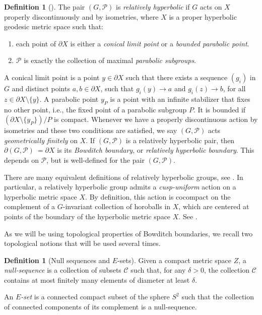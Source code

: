 \documentclass[11pt]{article}
\theoremstyle{definition}
\newtheorem{definition}[theorem]{Definition}
\newcommand\PP{\mathcal{P}}
\begin{document}
\begin{definition}[\cite{bowrelhyp}] \label{def:original rel hyp}  The pair $(G,\mathcal{P})$ is \textit{relatively hyperbolic} if $G$ acts on $X$ properly discontinuously and by isometries, where $X$ is a proper hyperbolic geodesic metric space such that:

\begin{enumerate}
	\item each point of $\partial X$ is either a \emph{conical limit point} or a \emph{bounded parabolic point}. 
	\item $\mathcal{P}$ is exactly the collection of maximal \emph{parabolic subgroups}.
\end{enumerate}

A conical limit point is a point $y \in \partial X$ such that
there exists a sequence $(g_i)$ in $G$  and distinct points $a, b \in \partial X$, such that $g_i(y) \rightarrow a$ and $g_i(z) \rightarrow b$, for all $z \in \partial X \setminus \{y\}$. A parabolic point $y_P$ is a point with an infinite stabilizer that fixes no other point, i.e., the fixed point of a parabolic subgroup $P$. It is  bounded if $(\partial X \setminus \{y_P\})/P$ is compact. 
Whenever we have a properly discontinuous action by isometries and these two conditions are satisfied, we say $(G, \mathcal{P})$ acts \textit{geometrically finitely} on $X$.  If $(G, \mathcal{P})$ is a relatively hyperbolic pair, then $\partial( G, \PP)\ = \partial X $ is its \textit{Bowditch boundary}, or \textit{relatively hyperbolic boundary}.  This depends on $\mathcal{P}$, but is well-defined for the pair $(G, \mathcal{P})$. 

\end{definition} 

There are many equivalent definitions of relatively hyperbolic groups, see \cite{Hruskasurvey}.  In particular, a relatively hyperbolic group admits a {\it cusp-uniform} action on a hyperbolic metric space $X$.  By definition, this action is cocompact on the complement of a $G$-invariant collection of horoballs in $X$, which are centered at points of the boundary of the hyperbolic metric space $X$.  See \cite[Chapter 3]{BuyaloS}. 


As we will be using topological properties of Bowditch boundaries, we recall two topological notions that will be used several times.

\begin{definition}[Null sequences and $E$-sets]\label{def:nses}
Given a compact metric space $Z$, a \emph{null-sequence} is a collection of subsets $\mathcal{C}$ such that, for any $\delta >0$, the collection $\mathcal{C}$ contains at most finitely many elements of diameter at least $\delta$.

An \emph{$E$-set} is a connected compact subset of the sphere $S^2$ such that the collection of connected components of its complement is a null-sequence.
\end{definition}
\end{document}
